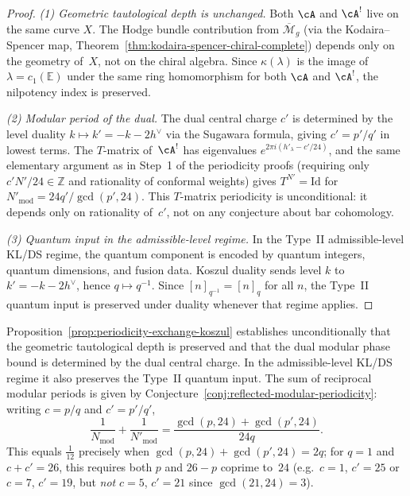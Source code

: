 \begin{proof}
\emph{(1) Geometric tautological depth is unchanged.}
Both $\cA$ and $\cA^!$ live on the same curve $X$.  The Hodge bundle contribution from $\overline{\mathcal{M}}_g$ (via the Kodaira--Spencer map, Theorem~\ref{thm:kodaira-spencer-chiral-complete}) depends only on the geometry of~$X$, not on the chiral algebra.  Since $\kappa(\lambda)$ is the image of $\lambda = c_1(\mathbb{E})$ under the same ring homomorphism for both $\cA$ and $\cA^!$, the nilpotency index is preserved.

\emph{(2) Modular period of the dual.}
The dual central charge $c'$ is determined by the level duality $k \mapsto k' = -k - 2h^\vee$ via the Sugawara formula, giving $c' = p'/q'$ in lowest terms.  The $T$-matrix of~$\cA^!$ has eigenvalues $e^{2\pi i(h'_\lambda - c'/24)}$, and the same elementary argument as in Step~1 of the periodicity proofs (requiring only $c'N'/24 \in \mathbb{Z}$ and rationality of conformal weights) gives $T^{N'} = \mathrm{Id}$ for $N'_{\text{mod}} = 24q'/\gcd(p',24)$.  This $T$-matrix periodicity is unconditional: it depends only on rationality of~$c'$, not on any conjecture about bar cohomology.

\emph{(3) Quantum input in the admissible-level regime.}
In the Type~II admissible-level KL/DS regime, the quantum component is
encoded by quantum integers, quantum dimensions, and fusion data.
Koszul duality sends level $k$ to $k' = -k - 2h^\vee$, hence
$q \mapsto q^{-1}$.  Since $[n]_{q^{-1}} = [n]_q$ for all $n$, the
Type~II quantum input is preserved under duality whenever that regime
applies.
\end{proof}

\begin{remark}\label{rem:periodicity-exchange-harmonic}
Proposition~\ref{prop:periodicity-exchange-koszul} establishes
unconditionally that the geometric tautological depth is preserved and
that the dual modular phase bound is determined by the dual central
charge.  In the admissible-level KL/DS regime it also preserves the
Type~II quantum input.  The sum of reciprocal modular periods is given by
Conjecture~\ref{conj:reflected-modular-periodicity}: writing $c = p/q$
and $c' = p'/q'$,
\[
\frac{1}{N_{\text{mod}}} + \frac{1}{N'_{\text{mod}}}
= \frac{\gcd(p,24) + \gcd(p',24)}{24q}.
\]
This equals $\frac{1}{12}$ precisely when $\gcd(p,24) + \gcd(p',24) = 2q$; for $q = 1$ and $c + c' = 26$, this requires both $p$ and $26 - p$ coprime to~$24$ (e.g.\ $c = 1$, $c' = 25$ or $c = 7$, $c' = 19$, but \emph{not} $c = 5$, $c' = 21$ since $\gcd(21, 24) = 3$).
\end{remark}



